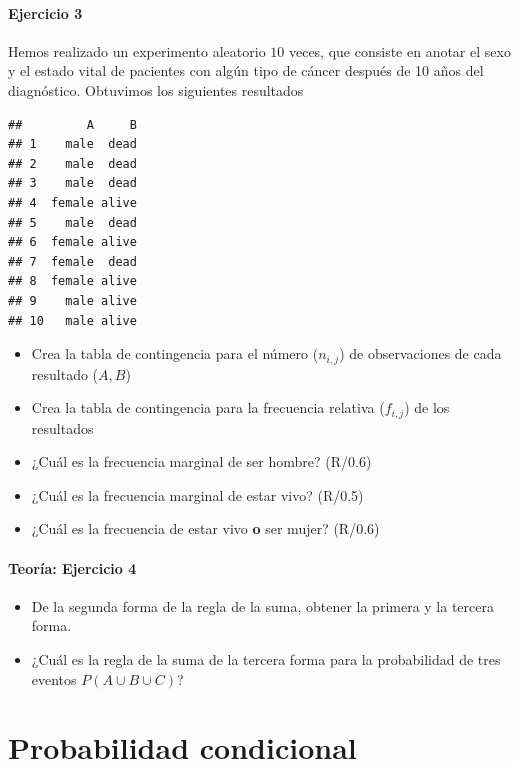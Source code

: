\documentclass[
]{book}
\providecommand{\tightlist}{%
  \setlength{\itemsep}{0pt}\setlength{\parskip}{0pt}}
\begin{document}
\hypertarget{ejercicio-3}{%
\subsubsection{Ejercicio 3}\label{ejercicio-3}}

Hemos realizado un experimento aleatorio \(10\) veces, que consiste en anotar el sexo y el estado vital de pacientes con algún tipo de cáncer después de 10 años del diagnóstico. Obtuvimos los siguientes resultados

\begin{verbatim}
##         A     B
## 1    male  dead
## 2    male  dead
## 3    male  dead
## 4  female alive
## 5    male  dead
## 6  female alive
## 7  female  dead
## 8  female alive
## 9    male alive
## 10   male alive
\end{verbatim}

\begin{itemize}
\tightlist
\item
  Crea la tabla de contingencia para el número (\(n_{i,j}\)) de observaciones de cada resultado (\(A,B\))
\item
  Crea la tabla de contingencia para la frecuencia relativa (\(f_{i,j}\)) de los resultados
\item
  ¿Cuál es la frecuencia marginal de ser hombre? (R/0.6)
\item
  ¿Cuál es la frecuencia marginal de estar vivo? (R/0.5)
\item
  ¿Cuál es la frecuencia de estar vivo \textbf{o} ser mujer? (R/0.6)
\end{itemize}

\hypertarget{teoruxeda-ejercicio-4}{%
\subsubsection{Teoría: Ejercicio 4}\label{teoruxeda-ejercicio-4}}

\begin{itemize}
\item
  De la segunda forma de la regla de la suma, obtener la primera y la tercera forma.
\item
  ¿Cuál es la regla de la suma de la tercera forma para la probabilidad de tres eventos \(P(A \cup B \cup C)\)?
\end{itemize}

\hypertarget{probabilidad-condicional}{%
\chapter{Probabilidad condicional}\label{probabilidad-condicional}}
\end{document}
